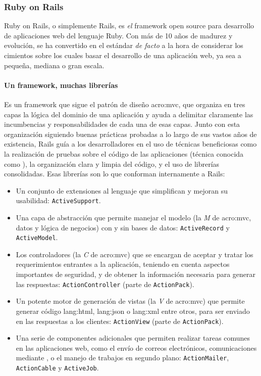 \subsubsection{Ruby on Rails}
\label{soa:tecnologias:rails}

Ruby on Rails, o simplemente Rails, es \textit{el} framework open source para desarrollo de aplicaciones web del lenguaje Ruby. Con más de 10 años de madurez y evolución, se ha convertido en el estándar \textit{de facto} a la hora de considerar los cimientos sobre los cuales basar el desarrollo de una aplicación web, ya sea a pequeña, mediana o gran escala.

\paragraph{Un framework, muchas librerías}

Es un framework que sigue el patrón de diseño \gls{acro:mvc}, que organiza en tres capas la lógica del dominio de una aplicación y ayuda a delimitar claramente las incumbencias y responsabilidades de cada una de esas capas. Junto con esta organización siguiendo buenas prácticas probadas a lo largo de sus vastos años de existencia, Rails guía a los desarrolladores en el uso de técnicas beneficiosas como la realización de pruebas sobre el código de las aplicaciones (técnica conocida como ), la organización clara y limpia del código, y el uso de librerías consolidadas. Esas librerías son lo que conforman internamente a Rails:

\begin{itemize}
  \item Un conjunto de extensiones al lenguaje que simplifican y mejoran su usabilidad: \texttt{ActiveSupport}.
  \item Una capa de abstracción que permite manejar el modelo (la \textit{M} de \gls{acro:mvc}, datos y lógica de negocios) con y sin bases de datos: \texttt{ActiveRecord} y \texttt{ActiveModel}.
  \item Los controladores (la \textit{C} de \gls{acro:mvc}) que se encargan de aceptar y tratar los requerimientos entrantes a la aplicación, teniendo en cuenta aspectos importantes de seguridad, y de obtener la información necesaria para generar las respuestas: \texttt{ActionController} (parte de \texttt{ActionPack}).
  \item Un potente motor de generación de vistas (la \textit{V} de \gls{acro:mvc}) que permite generar código \gls{lang:html}, \gls{lang:json} o \gls{lang:xml} entre otros, para ser enviado en las respuestas a los clientes: \texttt{ActionView} (parte de \texttt{ActionPack}).
  \item Una serie de componentes adicionales que permiten realizar tareas comunes en las aplicaciones web, como el envío de correos electrónicos, comunicaciones mediante , o el manejo de trabajos en segundo plano: \texttt{ActionMailer}, \texttt{ActionCable} y \texttt{ActiveJob}.
\end{itemize}

